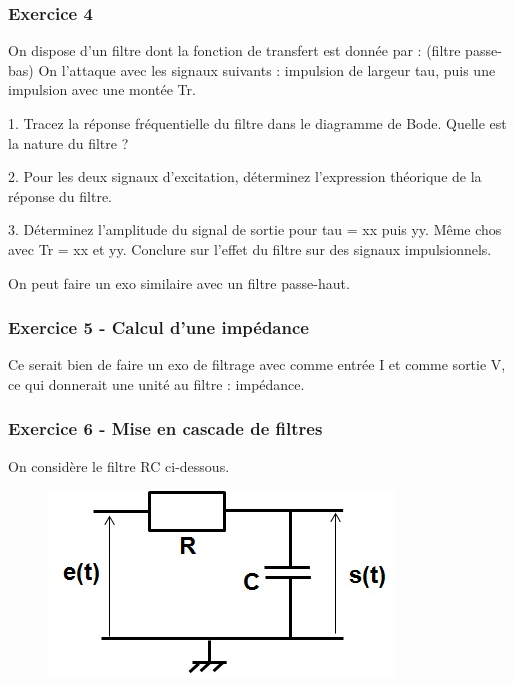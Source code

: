 	\vspace{1\baselineskip}
	
	\subsubsection{Exercice 4}
	On dispose d'un filtre dont la fonction de transfert est donnée par : (filtre passe-bas)
	On l'attaque avec les signaux suivants : impulsion de largeur tau, puis une impulsion avec une montée Tr.
	
	1. Tracez la réponse fréquentielle du filtre dans le diagramme de Bode. Quelle est la nature du filtre ?
	
	2. Pour les deux signaux d'excitation, déterminez l'expression théorique de la réponse du filtre.
	
	3. Déterminez l'amplitude du signal de sortie pour tau = xx puis yy. Même chos avec Tr = xx et yy. Conclure sur l'effet du filtre sur des signaux impulsionnels.
	
	On peut faire un exo similaire avec un filtre passe-haut.
	
	\vspace{1\baselineskip}
	
	\subsubsection{Exercice 5 - Calcul d'une impédance}
	
	Ce serait bien de faire un exo de filtrage avec comme entrée I et comme sortie V, ce qui donnerait une unité au filtre : impédance.
	
	\vspace{1\baselineskip}
	
	\subsubsection{Exercice 6 - Mise en cascade de filtres}
	On considère le filtre RC ci-dessous.
	
	\begin{figure}[h!]
		\centering
		\includegraphics[scale=0.5]{images/Filtre_RC_passe_bas.jpg} 
	\end{figure}
	
